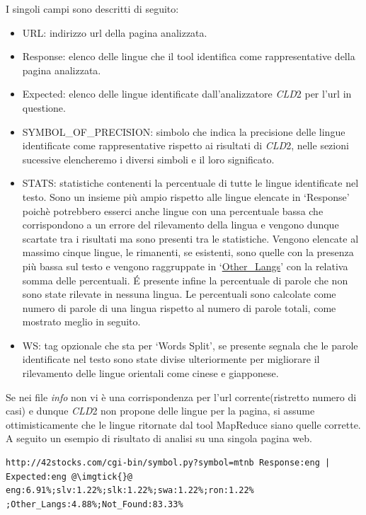 \documentclass{article}
\newcommand{\MR}{MapReduce}
\newcommand{\cld}{\textit{CLD}2}
\newcommand{\mintedstyle}[1]{\url{#1}}
\begin{document}
I singoli campi sono descritti di seguito:
\begin{itemize}
    \item URL: indirizzo url della pagina analizzata.
    \item Response: elenco delle lingue che il tool identifica come rappresentative della pagina analizzata.
    \item Expected: elenco delle lingue identificate dall'analizzatore \cld{} per l'url in questione.
    \item SYMBOL\_OF\_PRECISION: simbolo che indica la precisione delle lingue identificate come rappresentative rispetto ai risultati di \cld{}, nelle sezioni sucessive elencheremo i diversi simboli e il loro significato.
    \item STATS: statistiche contenenti la percentuale di tutte le lingue identificate nel testo. Sono un insieme più ampio rispetto alle lingue elencate in `Response' poichè potrebbero esserci anche lingue con una percentuale bassa che corrispondono a un errore del rilevamento della lingua e vengono dunque scartate tra i risultati ma sono presenti tra le statistiche. Vengono elencate al massimo cinque lingue, le rimanenti, se esistenti, sono quelle con la presenza più bassa sul testo e vengono raggruppate in `\mintedstyle{Other\_Langs}' con la relativa somma delle percentuali. \'E presente infine la percentuale di parole che non sono state rilevate in nessuna lingua. Le percentuali sono calcolate come numero di parole di una lingua rispetto al numero di parole totali, come mostrato meglio in seguito.
    \item WS: tag opzionale che sta per `Words Split', se presente segnala che le parole identificate nel testo sono state divise ulteriormente per migliorare il rilevamento delle lingue orientali come cinese e giapponese.
\end{itemize}

Se nei file \textit{info} non vi è una corrispondenza per l'url corrente(ristretto numero di casi) e dunque \cld{} non propone delle lingue per la pagina, si assume ottimisticamente che le lingue ritornate dal tool \MR{} siano quelle corrette. A seguito un esempio di risultato di analisi su una singola pagina web.

\begin{verbatim}
http://42stocks.com/cgi-bin/symbol.py?symbol=mtnb Response:eng |
Expected:eng @\imgtick{}@ eng:6.91%;slv:1.22%;slk:1.22%;swa:1.22%;ron:1.22%
;Other_Langs:4.88%;Not_Found:83.33%
\end{verbatim}
\end{document}
